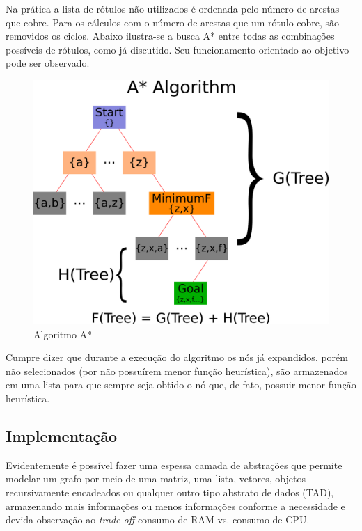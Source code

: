 \documentclass[12pt]{article}
\begin{document}
		Na prática a lista de rótulos não utilizados é ordenada pelo número de arestas que cobre. Para os cálculos com o número de arestas que um rótulo cobre, são removidos os ciclos. Abaixo ilustra-se a busca A* entre todas as combinações possíveis de rótulos, como já discutido. Seu funcionamento orientado ao objetivo pode ser observado.

		\begin{center}
		\begin{figure}[H]
		\includegraphics[width=1\textwidth]{aestrela.png}
		\caption{Algoritmo A*}
		\label{fig:aestrela}
		\end{figure}
		\end{center}

		Cumpre dizer que durante a execução do algoritmo os nós já expandidos, porém não selecionados (por não possuírem menor função heurística), são armazenados em uma lista para que sempre seja obtido o nó que, de fato, possuir menor função heurística.

	\subsection{Implementação}\label{sec:implementacao}

	Evidentemente é possível fazer uma espessa camada de abstrações que permite modelar um grafo por meio de uma matriz, uma lista, vetores, objetos recursivamente encadeados ou qualquer outro tipo abstrato de dados (TAD), armazenando mais informações ou menos informações conforme a necessidade e devida observação ao \textit{trade-off} consumo de RAM vs. consumo de CPU.
\end{document}
